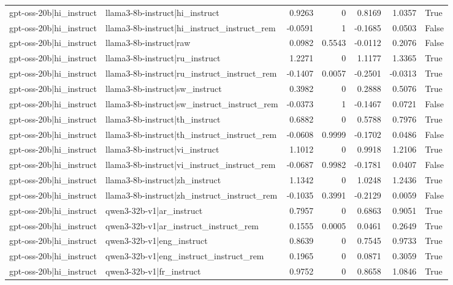 \begin{table}
\begin{tabular}{l l r r r r l}
gpt-oss-20b|hi_instruct & llama3-8b-instruct|hi_instruct & 0.9263 & 0 & 0.8169 & 1.0357 & True \\
gpt-oss-20b|hi_instruct & llama3-8b-instruct|hi_instruct_instruct_rem & -0.0591 & 1 & -0.1685 & 0.0503 & False \\
gpt-oss-20b|hi_instruct & llama3-8b-instruct|raw & 0.0982 & 0.5543 & -0.0112 & 0.2076 & False \\
gpt-oss-20b|hi_instruct & llama3-8b-instruct|ru_instruct & 1.2271 & 0 & 1.1177 & 1.3365 & True \\
gpt-oss-20b|hi_instruct & llama3-8b-instruct|ru_instruct_instruct_rem & -0.1407 & 0.0057 & -0.2501 & -0.0313 & True \\
gpt-oss-20b|hi_instruct & llama3-8b-instruct|sw_instruct & 0.3982 & 0 & 0.2888 & 0.5076 & True \\
gpt-oss-20b|hi_instruct & llama3-8b-instruct|sw_instruct_instruct_rem & -0.0373 & 1 & -0.1467 & 0.0721 & False \\
gpt-oss-20b|hi_instruct & llama3-8b-instruct|th_instruct & 0.6882 & 0 & 0.5788 & 0.7976 & True \\
gpt-oss-20b|hi_instruct & llama3-8b-instruct|th_instruct_instruct_rem & -0.0608 & 0.9999 & -0.1702 & 0.0486 & False \\
gpt-oss-20b|hi_instruct & llama3-8b-instruct|vi_instruct & 1.1012 & 0 & 0.9918 & 1.2106 & True \\
gpt-oss-20b|hi_instruct & llama3-8b-instruct|vi_instruct_instruct_rem & -0.0687 & 0.9982 & -0.1781 & 0.0407 & False \\
gpt-oss-20b|hi_instruct & llama3-8b-instruct|zh_instruct & 1.1342 & 0 & 1.0248 & 1.2436 & True \\
gpt-oss-20b|hi_instruct & llama3-8b-instruct|zh_instruct_instruct_rem & -0.1035 & 0.3991 & -0.2129 & 0.0059 & False \\
gpt-oss-20b|hi_instruct & qwen3-32b-v1|ar_instruct & 0.7957 & 0 & 0.6863 & 0.9051 & True \\
gpt-oss-20b|hi_instruct & qwen3-32b-v1|ar_instruct_instruct_rem & 0.1555 & 0.0005 & 0.0461 & 0.2649 & True \\
gpt-oss-20b|hi_instruct & qwen3-32b-v1|eng_instruct & 0.8639 & 0 & 0.7545 & 0.9733 & True \\
gpt-oss-20b|hi_instruct & qwen3-32b-v1|eng_instruct_instruct_rem & 0.1965 & 0 & 0.0871 & 0.3059 & True \\
gpt-oss-20b|hi_instruct & qwen3-32b-v1|fr_instruct & 0.9752 & 0 & 0.8658 & 1.0846 & True \\

\end{tabular}
\end{table}
